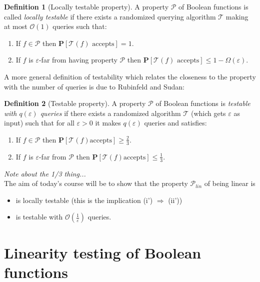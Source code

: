 \documentclass[a4paper]{article}
\newcommand{\prob}{\mathbf{P}}
\newcommand{\prty}{\mathcal{P}}
\newcommand{\eps}{\varepsilon}
\theoremstyle{plain}
\theoremstyle{definition}
\newtheorem{definition}{Definition}
\begin{document}
\begin{definition}[Locally testable property]
  A property \(\prty\) of Boolean functions is called \emph{locally
    testable} if there exists a randomized querying algorithm
  \(\mathcal{T}\) making at most \(\mathcal{O}(1)\) queries such that: 
  \begin{enumerate}[label=(\roman*)]
  \item If \(f \in \prty\) then \(\prob[\mathcal{T}(f) \text{ accepts}] = 1\).
  \item If \(f\) is \(\eps\)-far from having property \(\prty\) then
    \(\prob[\mathcal{T}(f) \text{ accepts}] \leq 1 - \Omega(\eps)\).
  \end{enumerate}
\end{definition}

\noindent A more general definition of testability which relates the
closeness to the property with the number of queries is due to
Rubinfeld and Sudan: 

\begin{definition}[Testable property]
  A property \(\prty\) of Boolean functions is \emph{testable with
    \(q(\eps)\) queries} if there exists a randomized algorithm
  \(\mathcal{T}\) (which gets \(\eps\) as input) such that for all
  \(\eps > 0\) it makes \(q(\eps)\) queries and satisfies:
  \begin{enumerate}[label=(\roman*)]
  \item If \(f \in \prty\) then \(\prob[\mathcal{T}(f) \text{
      accepts}] \geq \frac{2}{3}\).
  \item If \(f\) is \(\eps\)-far from \(\prty\) then \(\prob[\mathcal{T}(f) \text{
      accepts}] \leq \frac{1}{3}\).
  \end{enumerate}
\end{definition}

\emph{Note about the 1/3 thing...}\\

\noindent The aim of today's course will be to show that the property
\(\prty_{lin}\) of being linear is 
\begin{itemize}
\item is locally testable (this is the implication (i') \(\Rightarrow\)
  (ii'))
\item is testable with \(\mathcal{O}\left(\frac{1}{\eps}\right)\)
  queries. 
\end{itemize}


\section{Linearity testing of Boolean functions}
\label{sec:line-test-bool}
\end{document}
